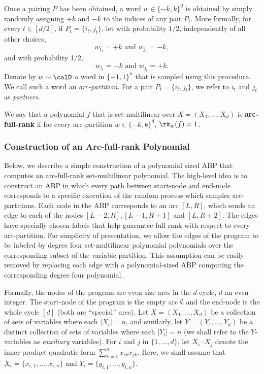\documentclass{article}
\begin{document}
Once a pairing $P$ has been obtained, a word $w\in \{-k,k\}^d$ is obtained by simply randomly assigning $+k$ and $-k$ to the indices of any pair $P_i$. More formally, for every
$t \in [d/2]$, if $P_t = \{i_t
, j_t\}$, let with probability $1/2$, independently of all other choices,
$$
w_{i_t} = +k \text{ and } w_{j_t} = -k,
$$
and with probability 1/2,
$$
w_{i_t} = -k \text{ and } w_{j_t} = +k.
$$
Denote by $w\sim \calD$ a word in $\{-1,1\}^n$ that is sampled using this procedure. We call such a word an \emph{arc-partition}. For a pair $P_t = \{i_t,j_t\}$, we refer to $i_t$ and $j_t$ as \emph{partners}. 

\begin{definition}\label{def:arc-full-rk}
We say that a polynomial $f$ that is set-multilinear over $X = (X_1, \ldots, X_{d})$ is \textbf{arc-full-rank} if for every arc-partition $w\in \{-k,k\}^d$, $\rk_w(f) = 1$.
\end{definition}


\subsubsection{Construction of an Arc-full-rank Polynomial}\label{subsubsec:arc-full-rank-poly}

Below, we describe a simple construction of a polynomial sized ABP that computes an arc-full-rank set-multilinear polynomial.
The high-level idea is to construct an ABP in which every path between start-node and end-node
corresponds to a specific execution of the random process which samples arc-partitions. Each node in the ABP corresponds to an arc $[L, R]$, which sends an edge to each of the nodes $[L - 2, R], [L -
1, R + 1]$ and $[L, R + 2]$. The edges have specially chosen labels that help guarantee full rank with respect to
every arc-partition. For simplicity of presentation, we allow the edges of the program to be labeled
by degree four set-multilinear polynomial polynomials over the corresponding subset of the variable partition. This assumption can be easily removed by replacing
each edge with a polynomial-sized ABP computing the corresponding degree four polynomial.

Formally, the nodes of the program are even-size arcs in the $d$-cycle, $d$ an even integer. The
start-node of the program is the empty arc $\emptyset$ and the end-node is the whole cycle $[d]$ (both are
“special” arcs). Let $X = (X_1,\ldots, X_{d})$ be a collection of sets of variables where each $|X_i| = n$, and similarly, let $Y = (Y_1,\ldots, Y_{d})$ be a distinct collection of sets of variables where each $|Y_i| = n$ (we shall refer to the $Y$-variables as \emph{auxiliary} variables). For $i$ and $j$ in $\{1,\ldots,d\}$, let $X_i \cdot X_j$ denote the inner-product quadratic form $\sum_{k = 1}^n x_{ik}x_{jk}$. Here, we shall assume that $X_i = \{x_{i,1},\ldots, x_{i,n}\}$ and $Y_i = \{y_{i,1},\ldots, y_{i,n}\}$.
\end{document}
